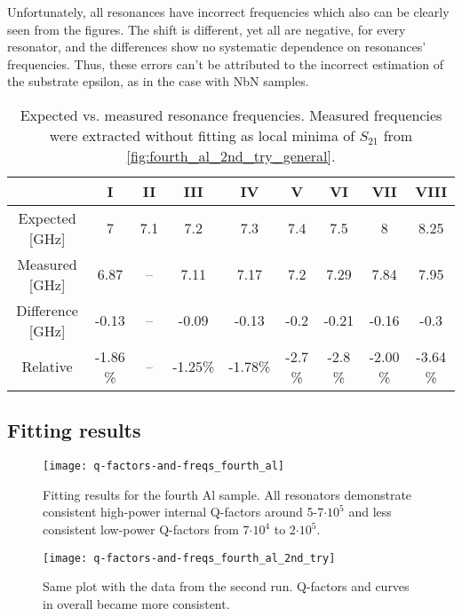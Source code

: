 \documentclass[12pt]{article}
\numberwithin{equation}{section}
\begin{document}
Unfortunately, all resonances have incorrect frequencies which also can be clearly seen from the figures. The shift is different, yet all are negative, for every resonator, and the differences show no systematic dependence on resonances' frequencies. Thus, these errors can't be attributed to the incorrect estimation of the substrate epsilon, as in the case with NbN samples.

\begin{table}[h]
\centering
\bgroup
\def\arraystretch{1.5}%
\begin{tabular}{c|*{8}{c}}
  & I & II & III & IV & V & VI & VII & VIII \\
\hline
Expected [GHz]& 7 & 7.1 & 7.2 & 7.3 & 7.4 & 7.5 & 8 & 8.25\\
Measured [GHz] & 6.87& -- &  7.11&  7.17&  7.2 &  7.29&  7.84&  7.95 \\
Difference [GHz]& -0.13& -- & -0.09& -0.13& -0.2 & -0.21& -0.16& -0.3 \\
Relative &-1.86 \%& -- & -1.25\%& -1.78\%& -2.7 \%& -2.8 \%& -2.00  \%& -3.64 \%
\end{tabular}
\egroup
\caption{Expected vs. measured resonance frequencies. Measured frequencies were extracted without fitting as local minima of $S_{21}$ from \autoref{fig:fourth_al_2nd_try_general}.}
\label{tab:freqs_third_al}
\end{table}

\subsection{Fitting results}


\begin{figure}[h]
\centering
\texttt{[image: q-factors-and-freqs\_fourth\_al]}
\caption{Fitting results for the fourth Al sample. All resonators demonstrate consistent high-power internal Q-factors around 5-7$\cdot 10^5$ and less consistent low-power Q-factors from 7$\cdot 10^4$ to 2$\cdot 10^5$.}
\end{figure}

\begin{figure}[h]
\centering
\texttt{[image: q-factors-and-freqs\_fourth\_al\_2nd\_try]}
\caption{Same plot with the data from the second run. Q-factors and curves in overall became more consistent.}
\end{figure}
\end{document}
